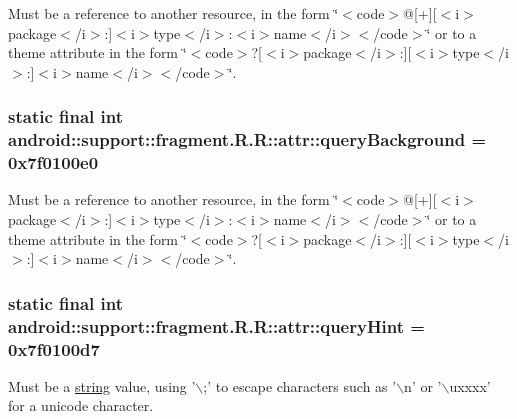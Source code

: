 Must be a reference to another resource, in the form \char`\"{}$<$code$>$@\mbox{[}+\mbox{]}\mbox{[}$<$i$>$package$<$/i$>$:\mbox{]}$<$i$>$type$<$/i$>$:$<$i$>$name$<$/i$>$$<$/code$>$\char`\"{} or to a theme attribute in the form \char`\"{}$<$code$>$?\mbox{[}$<$i$>$package$<$/i$>$:\mbox{]}\mbox{[}$<$i$>$type$<$/i$>$:\mbox{]}$<$i$>$name$<$/i$>$$<$/code$>$\char`\"{}. \hypertarget{classandroid_1_1support_1_1fragment_1_1_r_1_1attr_104281dcaefa2837f1cff9597048b4dc}{
\subsubsection[{queryBackground}]{\setlength{\rightskip}{0pt plus 5cm}static final int android::support::fragment.R.R::attr::queryBackground = 0x7f0100e0}}
\label{classandroid_1_1support_1_1fragment_1_1_r_1_1attr_104281dcaefa2837f1cff9597048b4dc}


Must be a reference to another resource, in the form \char`\"{}$<$code$>$@\mbox{[}+\mbox{]}\mbox{[}$<$i$>$package$<$/i$>$:\mbox{]}$<$i$>$type$<$/i$>$:$<$i$>$name$<$/i$>$$<$/code$>$\char`\"{} or to a theme attribute in the form \char`\"{}$<$code$>$?\mbox{[}$<$i$>$package$<$/i$>$:\mbox{]}\mbox{[}$<$i$>$type$<$/i$>$:\mbox{]}$<$i$>$name$<$/i$>$$<$/code$>$\char`\"{}. \hypertarget{classandroid_1_1support_1_1fragment_1_1_r_1_1attr_2515e225fa0decade03fa5abfcdf8df1}{
\subsubsection[{queryHint}]{\setlength{\rightskip}{0pt plus 5cm}static final int android::support::fragment.R.R::attr::queryHint = 0x7f0100d7}}
\label{classandroid_1_1support_1_1fragment_1_1_r_1_1attr_2515e225fa0decade03fa5abfcdf8df1}


Must be a \hyperlink{classandroid_1_1support_1_1fragment_1_1_r_1_1string}{string} value, using '$\backslash$;' to escape characters such as '$\backslash$n' or '$\backslash$uxxxx' for a unicode character. 

